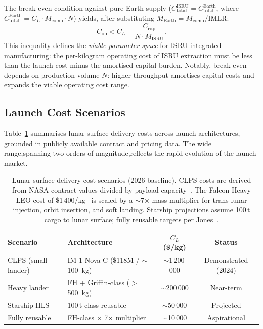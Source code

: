 \documentclass[11pt,a4paper]{article}
\begin{document}
The break-even condition against pure Earth-supply ($C_{\text{total}}^{\text{ISRU}} = C_{\text{total}}^{\text{Earth}}$, where $C_{\text{total}}^{\text{Earth}} = C_L \cdot M_{\text{comp}} \cdot N$) yields, after substituting $M_{\text{Earth}} = M_{\text{comp}} / \text{IMLR}$:
\begin{equation}
    C_{\text{op}} < C_L - \frac{C_{\text{cap}}}{N \cdot M_{\text{ISRU}}}.
    \label{eq:breakeven}
\end{equation}
This inequality defines the \emph{viable parameter space} for ISRU-integrated manufacturing: the per-kilogram operating cost of ISRU extraction must be less than the launch cost minus the amortised capital burden. Notably, break-even depends on production volume $N$: higher throughput amortises capital costs and expands the viable operating cost range.

\subsection{Launch Cost Scenarios}
\label{subsec:launch_scenarios}

Table~\ref{tab:launch_costs} summarises lunar surface delivery costs across launch architectures, grounded in publicly available contract and pricing data. The wide range,spanning two orders of magnitude,reflects the rapid evolution of the launch market.

\begin{table}[H]
\centering
\caption{Lunar surface delivery cost scenarios (2026 baseline). CLPS costs are derived from NASA contract values divided by payload capacity~\cite{NASAOIG2024}. The Falcon Heavy LEO cost of \$1\,400/kg~\cite{Jones2023} is scaled by a $\sim$7$\times$ mass multiplier for trans-lunar injection, orbit insertion, and soft landing. Starship projections assume 100\,t cargo to lunar surface; fully reusable targets per Jones~\cite{Jones2023}.}
\label{tab:launch_costs}
\begin{tabular}{lp{3.4cm}cc}
\toprule
\textbf{Scenario} & \textbf{Architecture} & \textbf{$C_L$ (\$/kg)} & \textbf{Status} \\
\midrule
CLPS (small lander) & IM-1 Nova-C (\$118M / $\sim$100~kg) & ${\sim}$1\,200\,000 & Demonstrated (2024) \\
Heavy lander & FH + Griffin-class ($>$500~kg) & ${\sim}$200\,000 & Near-term \\
Starship HLS & 100\,t-class reusable & ${\sim}$50\,000 & Projected \\
Fully reusable & FH-class $\times$ 7$\times$ multiplier & ${\sim}$10\,000 & Aspirational \\
\bottomrule
\end{tabular}
\end{table}
\end{document}
